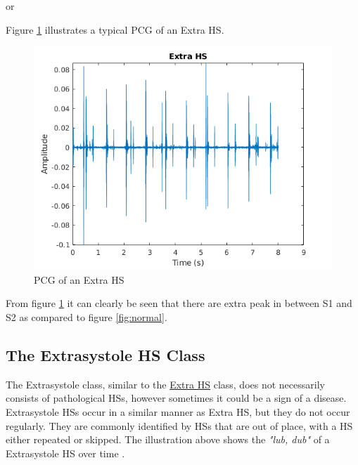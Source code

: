 \documentclass[10pt,twocolumn]{witseiepaper}
\begin{document}

\hspace{3.5cm} or 


Figure \ref{fig:extra} illustrates a typical PCG of an Extra HS.
\begin{figure}[h!]
    \centering
    \includegraphics[scale = 0.45]{./extra.png}
    \caption{PCG of an Extra HS}
    \label{fig:extra}
\end{figure}{}

From figure \ref{fig:extra} it can clearly be seen that there are extra peak in between S1 and S2 as compared to figure \ref{fig:normal}.

\subsection*{The Extrasystole HS Class}
The Extrasystole class, similar to the \hyperref[sec:extra]{Extra HS} class, does not necessarily consists of pathological HSs, however sometimes it could be a sign of a disease. Extrasystole HSs occur in a similar manner as Extra HS, but they do not occur regularly. They are commonly identified by HSs that are out of place, with a HS either repeated or skipped. The illustration above shows the \textit{"lub, dub"} of a Extrasystole HS over time \cite{bentley}.

\end{document}
